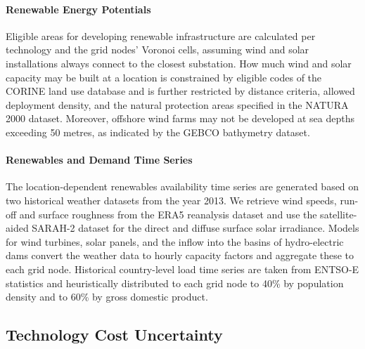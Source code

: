 
\paragraph{Renewable Energy Potentials}
Eligible areas for developing renewable infrastructure are calculated
per technology and the grid nodes' Voronoi cells, assuming wind and solar installations always connect to the closest substation. 
How much wind and solar capacity may be built at a location is constrained by
eligible codes of the CORINE land use database and is further restricted by distance criteria,
allowed deployment density, and the natural protection areas specified in the NATURA 2000 dataset.
Moreover, offshore wind farms may not be developed at sea depths exceeding 50 metres,
as indicated by the GEBCO bathymetry dataset. 


\paragraph{Renewables and Demand Time Series}
The location-dependent renewables availability time series are generated
based on two historical weather datasets from the year 2013.
We retrieve wind speeds, run-off and surface roughness from the ERA5 reanalysis dataset and
use the satellite-aided SARAH-2 dataset for the direct and diffuse surface solar irradiance.
Models for wind turbines, solar panels, and the inflow into the basins of hydro-electric dams
convert the weather data to hourly capacity factors and aggregate these to each grid node.
Historical country-level load time series are taken from ENTSO-E statistics and
heuristically distributed to each grid node to 40\% by population density and to 60\% by gross domestic product.


\subsection{Technology Cost Uncertainty}
\label{sec:uncertainty}

